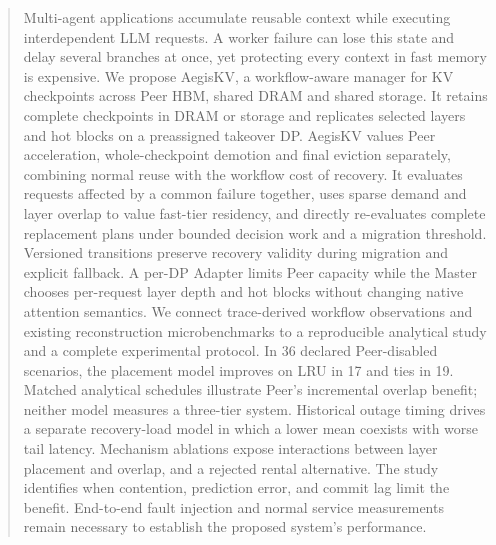 \begin{abstract}
Multi-agent applications accumulate reusable context while executing
interdependent LLM requests. A worker failure can lose this state and delay
several branches at once, yet protecting every context in fast memory is
expensive. We propose AegisKV, a workflow-aware manager for KV checkpoints
across Peer HBM, shared DRAM and shared storage. It retains complete
checkpoints in DRAM or storage and replicates selected layers and hot
blocks on a preassigned takeover DP. AegisKV values Peer acceleration,
whole-checkpoint demotion and final eviction separately, combining normal reuse
with the workflow cost of recovery. It evaluates requests affected by a
common failure together, uses sparse demand and layer overlap to value
fast-tier residency, and directly re-evaluates complete replacement plans
under bounded decision work and a migration threshold.
Versioned transitions preserve recovery validity during migration and
explicit fallback. A per-DP Adapter limits Peer capacity while the Master
chooses per-request layer depth and hot blocks without changing native
attention semantics. We connect trace-derived
workflow observations and existing reconstruction microbenchmarks to a
reproducible analytical study and a complete experimental protocol.
In 36 declared Peer-disabled scenarios, the placement model improves on
LRU in 17 and ties in 19. Matched analytical schedules illustrate Peer's
incremental overlap benefit; neither model measures a three-tier system. Historical outage timing drives a separate recovery-load model in which
a lower mean coexists with worse tail latency. Mechanism ablations expose
interactions between layer placement and overlap, and a rejected rental
alternative. The study identifies when contention, prediction error, and commit
lag limit the benefit. End-to-end fault injection and normal
service measurements remain necessary to establish the proposed system's
performance.
\end{abstract}
